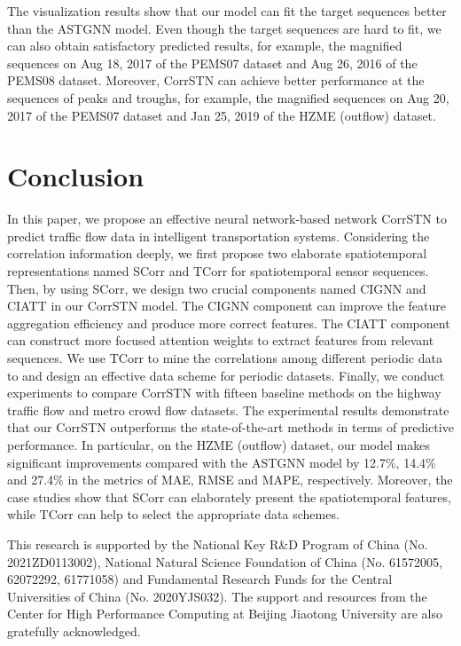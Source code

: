 \documentclass[sn-mathphys,iicol]{sn-jnl}
\theoremstyle{thmstyleone}\newtheorem{theorem}{Theorem}\newtheorem{proposition}[theorem]{Proposition}
\theoremstyle{thmstyletwo}\newtheorem{example}{Example}\newtheorem{remark}{Remark}
\theoremstyle{thmstylethree}\newtheorem{definition}{Definition}
\begin{document}
The visualization results show that our model can fit the target sequences better than the ASTGNN model. Even though the target sequences are hard to fit, we can also obtain satisfactory predicted results, for example, the magnified sequences on Aug 18, 2017 of the PEMS07 dataset and Aug 26, 2016 of the PEMS08 dataset. Moreover, CorrSTN can achieve better performance at the sequences of peaks and troughs, for example, the magnified sequences on Aug 20, 2017 of the PEMS07 dataset and Jan 25, 2019 of the HZME (outflow) dataset.



\section{Conclusion}
In this paper, we propose an effective neural network-based network CorrSTN to predict traffic flow data in intelligent transportation systems. Considering the correlation information deeply, we first propose two elaborate spatiotemporal representations named SCorr and TCorr for spatiotemporal sensor sequences. Then, by using SCorr, we design two crucial components named CIGNN and CIATT in our CorrSTN model. The CIGNN component can improve the feature aggregation efficiency and produce more correct features. The CIATT component can construct more focused attention weights to extract features from relevant sequences. We use TCorr to mine the correlations among different periodic data to and design an effective data scheme for periodic datasets. Finally, we conduct experiments to compare CorrSTN with fifteen baseline methods on the highway traffic flow and metro crowd flow datasets. The experimental results demonstrate that our CorrSTN outperforms the state-of-the-art methods in terms of predictive performance. In particular, on the HZME (outflow) dataset, our model makes significant improvements compared with the ASTGNN model by 12.7\%, 14.4\% and 27.4\% in the metrics of MAE, RMSE and MAPE, respectively. Moreover, the case studies show that SCorr can elaborately present the spatiotemporal features, while TCorr can help to select the appropriate data schemes.










\backmatter

This research is supported by the National Key R\&D Program of China (No. 2021ZD0113002), National Natural Science Foundation of China (No. 61572005, 62072292, 61771058) and Fundamental Research Funds for the Central Universities of China (No. 2020YJS032). The support and resources from the Center for High Performance Computing at Beijing Jiaotong University are also gratefully acknowledged.
\end{document}
